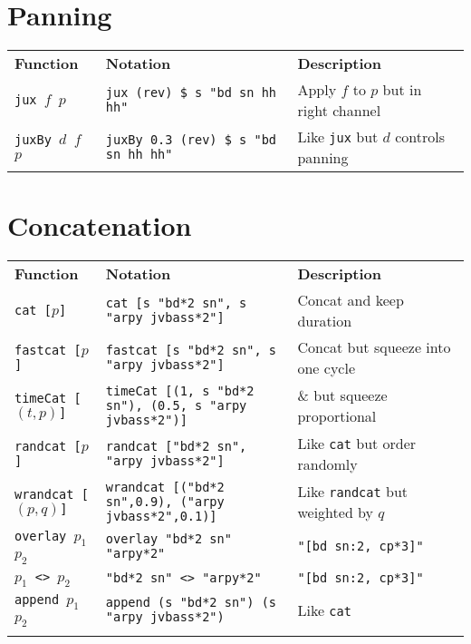 \documentclass[8pt]{extarticle} %
\begin{document}
\begin{multicols}{2}
	\section{Panning}
	{\small
	\begin{tabular}{L{0.2\linewidth} L{0.42\linewidth} L{0.38\linewidth} }
		\small\bf Function & \small\bf Notation & \small\bf Description \\ 
		\tt jux $f$ $p$  & \tt jux (rev) \$ s "bd sn hh hh" & Apply $f$ to $p$ but in right channel \\
		\tt juxBy  $d$ $f$ $p$  & \tt juxBy 0.3 (rev) \$ s "bd sn hh hh" & Like {\tt jux} but $d$ controls panning
	\end{tabular}
	}
	
	\section{Concatenation}
	{\small
	\begin{tabular}{L{0.2\linewidth} L{0.42\linewidth} L{0.38\linewidth} }
		\small\bf Function & \small\bf Notation & \small\bf Description \\ 
		\tt cat [$p$] & \tt cat [s "bd*2 sn", s "arpy jvbass*2"] & Concat and keep duration \\
		\tt fastcat [$p$] & \tt fastcat [s "bd*2 sn", s "arpy jvbass*2"] & Concat but squeeze into one cycle \\
		\tt timeCat [$(t, p)$] & \tt timeCat [(1, s "bd*2 sn"), (0.5, s "arpy jvbass*2")] & \& but squeeze proportional \\
		\tt randcat [$p$] & \tt randcat ["bd*2 sn", "arpy jvbass*2"] & Like {\tt cat} but order randomly \\
		\tt wrandcat [$(p, q)$] & \tt wrandcat [("bd*2 sn",0.9), ("arpy jvbass*2",0.1)] & Like {\tt randcat} but weighted by $q$ \\
		\tt overlay $p_1$ $p_2$ & \tt  overlay "bd*2 sn" "arpy*2" & {\tt "[bd sn:2, cp*3]" } \\
		\tt $p_1$ <> $p_2$ & \tt  "bd*2 sn" <> "arpy*2" & {\tt "[bd sn:2, cp*3]" } \\
		\tt append $p_1$ $p_2$ & \tt append (s "bd*2 sn") (s "arpy jvbass*2") & Like {\tt cat} \\

\end{tabular}}
\end{multicols}
\end{document}
